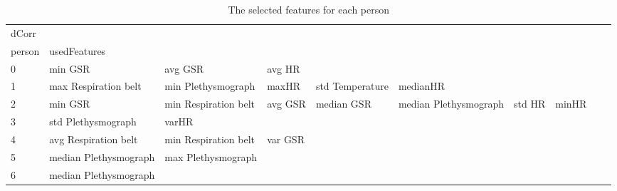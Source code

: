 \begin{landscape}
\begin{table}[]
\centering
\caption{The selected features for each person}
\begin{tabular}{l|llllllll}
dCorr    &                         &                         &                         &                         &                         &                       &                         &                         &                         &         \\
person   & usedFeatures            &                         &                         &                         &                         &                       &                         &                         &                         &         \\
0        & min GSR                 & avg GSR                 & avg HR                  &                         &                         &                       &                         &                         &                         &         \\
1        & max Respiration belt    & min Plethysmograph      & maxHR                   & std Temperature         & medianHR                &                       &                         &                         &                         &         \\
2        & min GSR                 & min Respiration belt    & avg GSR                 & median GSR              & median Plethysmograph   & std HR                & minHR                   &                         &                         &         \\
3        & std Plethysmograph      & varHR                   &                         &                         &                         &                       &                         &                         &                         &         \\
4        & avg Respiration belt    & min Respiration belt    & var GSR                 &                         &                         &                       &                         &                         &                         &         \\
5        & median Plethysmograph   & max Plethysmograph      &                         &                         &                         &                       &                         &                         &                         &         \\
6        & median Plethysmograph   &                         &                         &                         &                         &                       &                         &                         &                         &         \\

\end{tabular}
\end{table}
\end{landscape}
